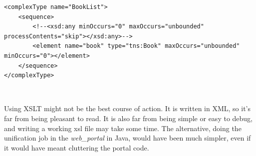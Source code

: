 \begin{lstlisting}
<complexType name="BookList">
	<sequence>
		<!--<xsd:any minOccurs="0" maxOccurs="unbounded" processContents="skip"></xsd:any>-->
		<element name="book" type="tns:Book" maxOccurs="unbounded" minOccurs="0"></element>
	</sequence>
</complexType>
\end{lstlisting}
\

\begin{framewarning}
    Using XSLT might not be the best course of action. It is written in XML, so
    it's far from being pleasant to read. It is also far from being simple or
    easy to debug, and writing a working xsl file may take some time. The
    alternative, doing the unification job in the \emph{web\_portal} in Java,
    would have been much simpler, even if it would have meant cluttering the
    portal code.
\end{framewarning}

\newpage
